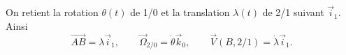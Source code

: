 \begin{corrigebox}
On retient la rotation $\theta(t)$ de 1/0 et la translation $\lambda(t)$ de
2/1 suivant $\vec i_1$. Ainsi
\[\overrightarrow{AB}=\lambda\vec i_1,\qquad
  \vec\Omega_{2/0}=\dot\theta\vec k_0,\qquad
  \vec V(B,2/1)=\dot\lambda\vec i_1.\]
\end{corrigebox}
